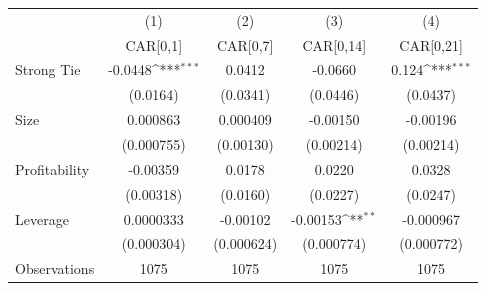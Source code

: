 {
\def\sym#1{\ifmmode^{#1}\else\(^{#1}\)\fi}
\begin{tabular}{l*{4}{c}}
\hline\hline
                    &\multicolumn{1}{c}{(1)}&\multicolumn{1}{c}{(2)}&\multicolumn{1}{c}{(3)}&\multicolumn{1}{c}{(4)}\\
                    &\multicolumn{1}{c}{CAR[0,1]}&\multicolumn{1}{c}{CAR[0,7]}&\multicolumn{1}{c}{CAR[0,14]}&\multicolumn{1}{c}{CAR[0,21]}\\
\hline
Strong Tie          &     -0.0448\sym{***}&      0.0412         &     -0.0660         &       0.124\sym{***}\\
                    &    (0.0164)         &    (0.0341)         &    (0.0446)         &    (0.0437)         \\
[1em]
Size                &    0.000863         &    0.000409         &    -0.00150         &    -0.00196         \\
                    &  (0.000755)         &   (0.00130)         &   (0.00214)         &   (0.00214)         \\
[1em]
Profitability       &    -0.00359         &      0.0178         &      0.0220         &      0.0328         \\
                    &   (0.00318)         &    (0.0160)         &    (0.0227)         &    (0.0247)         \\
[1em]
Leverage            &   0.0000333         &    -0.00102         &    -0.00153\sym{**} &   -0.000967         \\
                    &  (0.000304)         &  (0.000624)         &  (0.000774)         &  (0.000772)         \\
\hline
Observations        &        1075         &        1075         &        1075         &        1075         \\
\hline\hline
\end{tabular}
}
